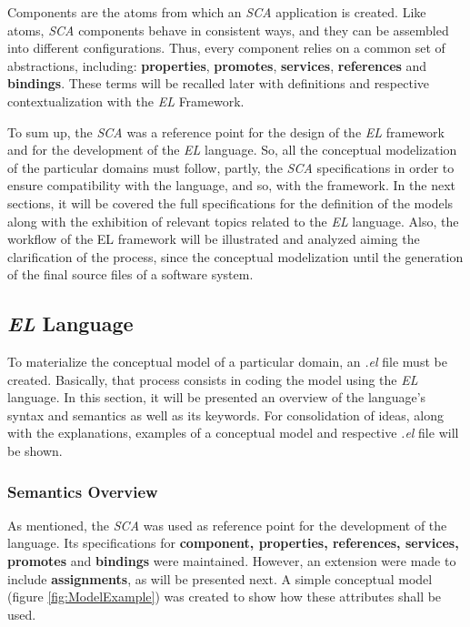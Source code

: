 \documentclass[12pt]{article}
\begin{document}
{Components are the atoms from which an \textit{SCA} application is created. Like atoms, \textit{SCA} components behave in consistent ways, and they can be assembled into different configurations. Thus, every component relies on a common set of abstractions, including: \textbf{properties}, \textbf{promotes}, \textbf{services}, \textbf{references} and \textbf{bindings}. \cite{SCA_site} These terms will be recalled later with definitions and respective contextualization with the \textit{EL} Framework. 
 
To sum up, the \textit{SCA} was a reference point for the design of the \textit{EL} framework and for the development of the \textit{EL} language. So, all the conceptual modelization of the particular domains must follow, partly, the \textit{SCA} specifications in order to ensure compatibility with the language, and so, with the framework. In the next sections, it will be covered the full specifications for the definition of the models along with the exhibition of relevant topics related to the \textit{EL} language. Also, the workflow of the EL framework will be illustrated and analyzed aiming the clarification of the process, since the conceptual modelization until the generation of the final source files of a software system.  

\subsection{\textit{EL} Language}

To materialize the conceptual model of a particular domain, an \textit{.el} file must be created. Basically, that process consists in coding the model using the \textit{EL} language. In this section, it will be presented an overview of the language's syntax and semantics as well as its keywords. For consolidation of ideas, along with the explanations, examples of a conceptual model and respective \textit{.el} file will be shown.

\subsubsection{Semantics Overview}

As mentioned, the \textit{SCA} was used as reference point for the development of the language. Its specifications for \textbf{component, properties, references, services, promotes} and \textbf{bindings} were maintained. However, an extension were made to include \textbf{assignments}, as will be presented next. A simple conceptual model (figure \ref{fig:ModelExample}) was created to show how these attributes shall be used.

}
\end{document}
